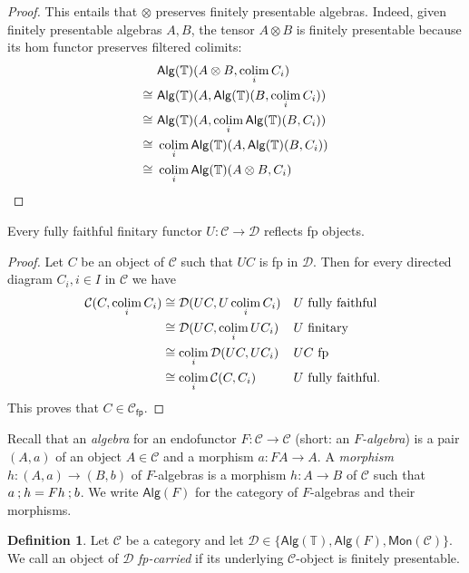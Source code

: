 \documentclass[a4paper, UKenglish, numberwithinsect, thm-restate, cleveref, final]{lipics-v2021}
\theoremstyle{plain}
\theoremstyle{definition}
\newtheorem{defn}[theorem]{Definition} \newtheorem{expl}[theorem]{Example} \newtheorem{rem}[theorem]{Remark} \newtheorem{notn}[theorem]{Notation} \newtheorem{assumption}[theorem]{Assumption}
\newcommand{\C}{\ensuremath{\mathcal{C}}}
\newcommand{\T}{\ensuremath{\mathbb{T}}\xspace}
\newcommand{\seq}{\ensuremath{\mathbin{\text{\upshape;}}}}
\newcommand{\D}{\ensuremath{\mathcal{D}}}
\newcommand{\Alg}{\ensuremath{\mathsf{Alg}}}
\def\colim{\qopname\relax m{colim}}
\newcommand{\fp}{\mathsf{fp}}
\newcommand{\Cfp}{\C_\fp}
\newcommand{\cat}[1]{\ensuremath{\mathcal{#1}}\xspace}
\newcommand{\Mon}{\mathsf{Mon}}
\def\colim{\qopname\relax m{colim}}
\newcommand{\tensor}{\mathbin{\otimes}}
\numberwithin{equation}{section}
\begin{document}
\begin{proof}
This entails that $\otimes$ preserves finitely presentable algebras. Indeed, given finitely presentable algebras $A,B$, the tensor \(A \tensor B\) is finitely presentable because its hom functor preserves filtered colimits:
  \begin{align*}
      & \Alg(\T)(A \tensor B, \colim_{i} C_{i}) \\
       \cong\,\, & \Alg(\T)(A, \Alg(\T)(B, \colim_{i}C_{i})) \\
    \cong\,\, & \Alg(\T)(A, \colim_{i} \Alg(\T)(B, C_{i})) \\
    \cong\,\, & \colim_{i} \Alg(\T)(A, \Alg(\T)(B, C_{i})) \\
    \cong\,\, & \colim_{i}\Alg(\T)(A \tensor B, C_{i}) \qedhere
  \end{align*}
\end{proof}

\begin{lemma}\label{lem:ful-faith-fin-reflect-fp}
    Every fully faithful finitary functor \(U \colon \C \rightarrow \cat D\) reflects fp objects.
\end{lemma}

\begin{proof}
Let \(C\) be an object of \(\C\) such that \(UC\) is fp in \(\D\).
Then for every directed diagram \(C_{i}, i \in I\) in \cat C we have
\begin{align*}
  \cat{C}(C, \colim_{i} C_{i}) &\cong \cat{D}(UC, U\colim_{i} C_{i}) && \text{\(U\) fully faithful} \\
                               &\cong \cat{D}(UC, \colim_{i}UC_{i}) && \text{\(U\) finitary} \\
                               &\cong \colim_{i}\cat{D}(UC, UC_{i}) && \text{\(UC\) fp} \\
                               &\cong \colim_{i} \cat{C}(C, C_{i}) && \text{\(U\) fully faithful. }
\end{align*}
This proves that $C\in \Cfp$.
\end{proof}
Recall that an \emph{algebra} for an endofunctor $F\colon \C\to \C$ (short: an \emph{\(F\)-algebra}) is a pair $(A,a)$ of an object $A\in \C$ and a morphism $a\colon FA\to A$. A \emph{morphism} $h\colon (A,a)\to (B,b)$ of $F$-algebras is a morphism $h\colon A\to B$ of $\C$ such that $a\seq h= Fh\seq b$. We write $\Alg(F)$ for the category of $F$-algebras and their morphisms.

\begin{defn}
  Let \(\C\) be a category and let \(\D \in \{\Alg(\T), \Alg(F), \Mon(\C)\}\).
  We call an object of \(\D\) \emph{fp-carried} if its underlying \(\C\)-object is finitely presentable.
\end{defn}
\end{document}
